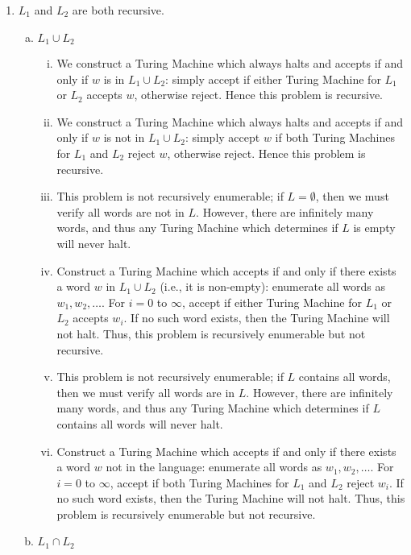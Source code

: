 \begin{enumerate}[1.]
    \item \(L_1\) and \(L_2\) are both recursive.
    \begin{enumerate}[a.]
        \item \(L_1 \cup L_2\)
        \begin{enumerate}[i.]
            \item We construct a Turing Machine which always halts and accepts if and only if \(w\) is in \(L_1 \cup L_2\): simply accept if either Turing Machine for \(L_1\) or \(L_2\) accepts \(w\), otherwise reject. Hence this problem is recursive. 
            \item We construct a Turing Machine which always halts and accepts if and only if \(w\) is not in \(L_1 \cup L_2\): simply accept \(w\) if both Turing Machines for \(L_1\) and \(L_2\) reject \(w\), otherwise reject. Hence this problem is recursive. 
            \item This problem is not recursively enumerable; if \(L = \emptyset \), then we must verify all words are not in \(L\). However, there are infinitely many words, and thus any Turing Machine which determines if \(L\) is empty will never halt. 
            \item Construct a Turing Machine which accepts if and only if there exists a word \(w\) in \(L_1 \cup L_2\) (i.e., it is non-empty): enumerate all words as \(w_1, w_2, \hdots \). For \(i=0\) to \(\infty \), accept if either Turing Machine for \(L_1\) or \(L_2\) accepts \(w_i\). If no such word exists, then the Turing Machine will not halt. Thus, this problem is recursively enumerable but not recursive.
            \item This problem is not recursively enumerable; if \(L\) contains all words, then we must verify all words are in \(L\). However, there are infinitely many words, and thus any Turing Machine which determines if \(L\) contains all words will never halt. 
            \item Construct a Turing Machine which accepts if and only if there exists a word \(w\) not in the language: enumerate all words as \(w_1, w_2, \hdots \). For \(i=0\) to \(\infty \), accept if both Turing Machines for \(L_1\) and \(L_2\) reject \(w_i\). If no such word exists, then the Turing Machine will not halt. Thus, this problem is recursively enumerable but not recursive.
        \end{enumerate}
        \item \(L_1 \cap L_2\)
        \begin{enumerate}[i.]

\end{enumerate}
\end{enumerate}
\end{enumerate}
